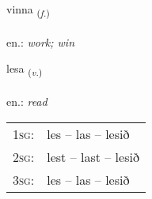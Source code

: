 \documentclass[frontgrid, backgrid]{flacards}\usepackage[]{graphicx}\usepackage[]{xcolor}
\begin{document}
\renewcommand{\flhead}{\vskip5pt \fboxsep=0pt {\small\bfseries\footnotesize Nafnorð | Noun}}
\renewcommand{\fcfoot}{\vskip5pt \fboxsep=0pt \hspace{2pt}{\small\bfseries\footnotesize 1K}}

\renewcommand{\blhead}{\vskip5pt {\small\bfseries\footnotesize Nafnorð | Noun }}
\renewcommand{\bcfoot}{\vskip5pt \hspace{2pt}{\small\bfseries\footnotesize 1K}}


{vinna \small{\textsubscript{(\textit{f.})}} \\[1ex] %
\textphonetic{[vɪna]} \\
en.: \emph{work; win} \\  [2ex]
\renewcommand*{\arraystretch}{0.8}
}

\renewcommand{\flhead}{\vskip5pt \fboxsep=0pt {\small\bfseries\footnotesize Sagnorð | Verb}}
\renewcommand{\fcfoot}{\vskip5pt \fboxsep=0pt \hspace{2pt}{\small\bfseries\footnotesize 1K}}

\renewcommand{\blhead}{\vskip5pt {\small\bfseries\footnotesize Sagnorð | Verb }}
\renewcommand{\bcfoot}{\vskip5pt \hspace{2pt}{\small\bfseries\footnotesize 1K}}


{lesa \small{\textsubscript{(\textit{v.})}} \\[1ex] %
\textphonetic{[lɛːsa]} \\
en.: \emph{read} \\  [2ex]
\renewcommand*{\arraystretch}{0.8}
\begin{tabular}{p{1cm}l}
\textsc{1sg}: & les -- las -- lesið \\ 
\textsc{2sg}: & lest -- last -- lesið \\ 
\textsc{3sg}: & les -- las -- lesið \\ 
\end{tabular}
}
\end{document}
